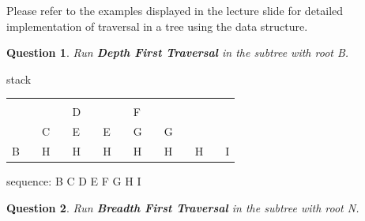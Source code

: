 \documentclass{article}
\newtheorem{Q}{Question}
\begin{document}
Please refer to the examples displayed in the lecture slide for detailed implementation of traversal in a tree using the data structure.


\vspace{0.1cm}
\begin{Q}
	Run \textbf{Depth First Traversal} in the subtree with root B.
\end{Q}

\vspace{0.5cm}
stack

\begin{table}[htb]
	\centering\begin{tabular}{|l|l|l|l|l|l|l|l|l|l|l|l|l|l|l|}
		\cline{1-1} \cline{3-3} \cline{5-5} \cline{7-7} \cline{9-9} \cline{11-11} \cline{13-13} \cline{15-15}
		  &  &   &  &   &  &   &  &   &  &   &  &   &  &   \\ \cline{1-1} \cline{3-3} \cline{5-5} \cline{7-7} \cline{9-9} \cline{11-11} \cline{13-13} \cline{15-15}
		  &  &   &  & D &  &   &  & F &  &   &  &   &  &   \\ \cline{1-1} \cline{3-3} \cline{5-5} \cline{7-7} \cline{9-9} \cline{11-11} \cline{13-13} \cline{15-15}
		  &  & C &  & E &  & E &  & G &  & G &  &   &  &   \\ \cline{1-1} \cline{3-3} \cline{5-5} \cline{7-7} \cline{9-9} \cline{11-11} \cline{13-13} \cline{15-15}
		B &  & H &  & H &  & H &  & H &  & H &  & H &  & I \\ \cline{1-1} \cline{3-3} \cline{5-5} \cline{7-7} \cline{9-9} \cline{11-11} \cline{13-13} \cline{15-15}
	\end{tabular}
\end{table}

sequence: B C D E F G H I
\vspace{2cm}
\begin{Q}
	Run \textbf{Breadth First Traversal} in the subtree with root N.
\end{Q}

\vspace{0.5cm}
\end{document}
